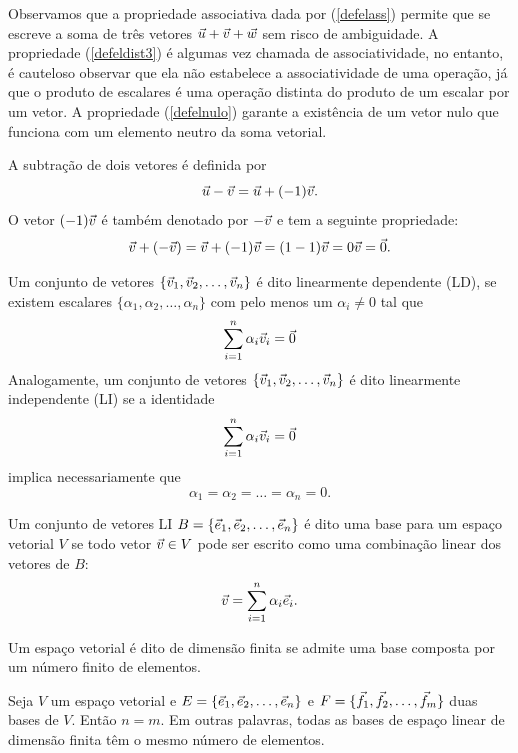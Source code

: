 Observamos que a propriedade associativa dada por (\ref{defelass}) permite que se escreve a soma de três vetores $\vec{u}+\vec{v}+\vec{w}$ sem risco de ambiguidade. A propriedade (\ref{defeldist3}) é algumas vez chamada de associatividade, no entanto, é cauteloso observar que ela não estabelece a associatividade de uma operação, já que o produto de escalares é uma operação distinta do produto de um escalar por um vetor. A propriedade (\ref{defelnulo}) garante a existência de um vetor nulo que funciona com um elemento neutro da soma vetorial. 

A subtração de dois vetores é definida por
\begin{equation}\label{delsub}
\vec{u}-\vec{v}=\vec{u}+ (-1) \vec{v}.
\end{equation}
O vetor $(-1) \vec{v}$ é também denotado por $-\vec{v}$ e tem a seguinte propriedade:
\begin{equation}\label{delinvad}
\vec{v}+(-\vec{v})=\vec{v}+(-1) \vec{v} = (1-1)\vec{v}=0\vec{v}=\vec{0}.
\end{equation}

Um conjunto de vetores $\{\vec{v}_1, \vec{v}_2,\ldots, \vec{v}_n\}$ é dito linearmente dependente (LD), se existem escalares $\{\alpha_1,\alpha_2,\ldots, \alpha_n\}$ com pelo menos um $\alpha_i\neq 0$ tal que
$$\sum_{i=1}^n\alpha_i \vec{v}_i=\vec{0}$$ 
Analogamente, um conjunto de vetores $\{\vec{v}_1, \vec{v}_2,\ldots, \vec{v}_n\}$ é dito linearmente independente (LI) se a identidade 
$$\sum_{i=1}^n\alpha_i \vec{v}_i=\vec{0}$$ 
implica necessariamente que
$$\alpha_1=\alpha_2=\ldots=\alpha_n=0.$$

Um conjunto de vetores LI $B=\{\vec{e}_1, \vec{e}_2,\ldots, \vec{e}_n\}$ é dito uma base para um espaço vetorial $V$ se todo vetor $\vec{v}\in V$ pode ser escrito como uma combinação linear dos vetores de $B$:
$$\vec{v}=\sum_{i=1}^n \alpha_i \vec{e}_i.$$ 

Um espaço vetorial é dito de dimensão finita se admite uma base composta por um número finito de elementos.

\begin{teo}\label{teo_dim} Seja $V$ um espaço vetorial e $E=\{\vec{e}_1, \vec{e}_2,\ldots, \vec{e}_n\}$ e $F=\{\vec{f}_1, \vec{f}_2,\ldots, \vec{f}_m\}$ duas bases de $V$. Então $n=m$. Em outras palavras, todas as bases de espaço linear de dimensão finita têm o mesmo número de elementos.
 \end{teo}

